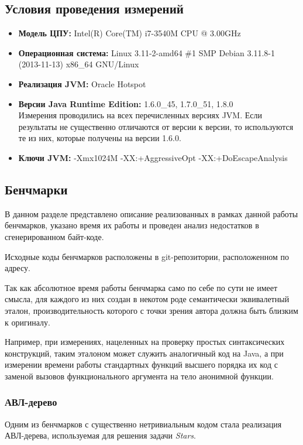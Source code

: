\subsection{Условия проведения измерений}
\begin{itemize}
    \item \textbf{Модель ЦПУ:} Intel(R) Core(TM) i7-3540M CPU @ 3.00GHz
    \item \textbf{Операционная система:} Linux 3.11-2-amd64 \#1 SMP Debian 3.11.8-1 (2013-11-13) x86\_64 GNU/Linux
    \item \textbf{Реализация JVM:} Oracle Hotspot
    \item \textbf{Версии Java Runtime Edition:} 1.6.0\_45, 1.7.0\_51, 1.8.0 \\
    Измерения проводились на всех перечисленных версиях JVM.
    Если результаты не существенно отличаются от версии к версии, то используются те из них,
    которые получены на версии 1.6.0.
    \item \textbf{Ключи JVM:} -Xmx1024M -XX:+AggressiveOpt -XX:+DoEscapeAnalysis
\end{itemize}

\subsection{Бенчмарки}
\label{section:benchmarks}
В данном разделе представлено описание реализованных в рамках данной работы бенчмарков, указано
время их работы и проведен анализ недостатков в сгенерированном байт-коде.

Исходные коды бенчмарков расположены в git-репозитории, расположенном по адресу\cite{Benchmark}.

Так как абсолютное время работы бенчмарка само по себе по сути не имеет смысла, для каждого из
них создан в некотом роде семантически эквивалетный эталон, производительность которого
с точки зрения автора должна быть близким к оригиналу.

Например, при измерениях, нацеленных на проверку простых синтаксических конструкций, таким эталоном
может служить аналогичный код на Java, а при измерении времени работы стандартных функций высшего
порядка их код с заменой вызовов функционального аргумента на тело анонимной функции.

\subsubsection{АВЛ-дерево}
\label{section:avl:bm}
Одним из бенчмарков с существенно нетривиальным кодом стала реализация АВЛ-дерева, используемая
для решения задачи \textit{Stars}.

